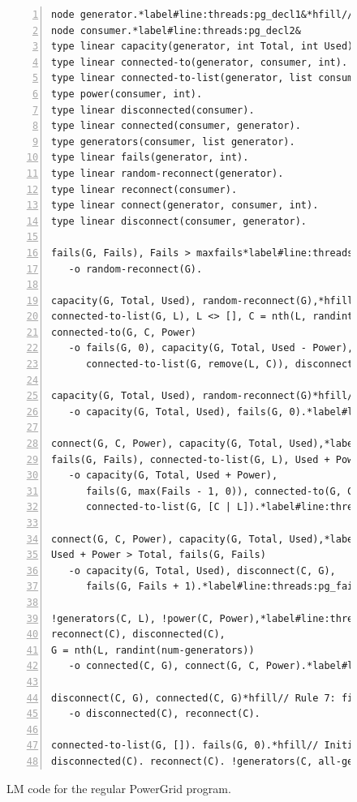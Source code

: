 \begin{figure}[h!]
\begin{Verbatim}[numbers=left,fontsize=\scriptsize,commandchars=*\#\&]
node generator.*label#line:threads:pg_decl1&*hfill// Type declaration
node consumer.*label#line:threads:pg_decl2&
type linear capacity(generator, int Total, int Used).*hfill// Predicate declaration
type linear connected-to(generator, consumer, int).
type linear connected-to-list(generator, list consumer).
type power(consumer, int).
type linear disconnected(consumer).
type linear connected(consumer, generator).
type generators(consumer, list generator).
type linear fails(generator, int).
type linear random-reconnect(generator).
type linear reconnect(consumer).
type linear connect(generator, consumer, int).
type linear disconnect(consumer, generator).

fails(G, Fails), Fails > maxfails*label#line:threads:pg_recon1&*hfill// Rule 1: disconnect one consumer
   -o random-reconnect(G).

capacity(G, Total, Used), random-reconnect(G),*hfill// Rule 2: disconnect one consumer
connected-to-list(G, L), L <> [], C = nth(L, randint(length(L))),
connected-to(G, C, Power)
   -o fails(G, 0), capacity(G, Total, Used - Power),
      connected-to-list(G, remove(L, C)), disconnect(C, G).

capacity(G, Total, Used), random-reconnect(G)*hfill// Rule 3: unable to disconnect one consumer
   -o capacity(G, Total, Used), fails(G, 0).*label#line:threads:pg_recon2&

connect(G, C, Power), capacity(G, Total, Used),*label#line:threads:pg_gen1&*hfill// Rule 4: connect consumer
fails(G, Fails), connected-to-list(G, L), Used + Power <= Total
   -o capacity(G, Total, Used + Power),
      fails(G, max(Fails - 1, 0)), connected-to(G, C, Power),
      connected-to-list(G, [C | L]).*label#line:threads:pg_gen2&

connect(G, C, Power), capacity(G, Total, Used),*label#line:threads:pg_fail1&*hfill// Rule 5: unable to connect consumer
Used + Power > Total, fails(G, Fails)
   -o capacity(G, Total, Used), disconnect(C, G),
      fails(G, Fails + 1).*label#line:threads:pg_fail2&

!generators(C, L), !power(C, Power),*label#line:threads:pg_connect1&*hfill// Rule 6: connect to a generator
reconnect(C), disconnected(C),
G = nth(L, randint(num-generators))
   -o connected(C, G), connect(G, C, Power).*label#line:threads:pg_connect2&

disconnect(C, G), connected(C, G)*hfill// Rule 7: finish disconnection
   -o disconnected(C), reconnect(C).

connected-to-list(G, []). fails(G, 0).*hfill// Initial facts
disconnected(C). reconnect(C). !generators(C, all-generators).
\end{Verbatim}
\caption{LM code for the regular PowerGrid program.}
\label{code:threads:powergrid}
\end{figure}

